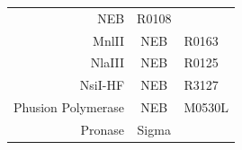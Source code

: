 \documentclass[11pt,singlespacinge,twoside]{reedthesis} %
\theoremstyle{definition}
\theoremstyle{definition}
\theoremstyle{definition}
\theoremstyle{remark}
\begin{document}
\begin{longtable}[]{@{}rcl@{}}
\begin{minipage}[t]{0.33\columnwidth}
NEB\strut
\end{minipage} & \begin{minipage}[t]{0.29\columnwidth}\raggedright
R0108\strut
\end{minipage}\tabularnewline
\begin{minipage}[t]{0.29\columnwidth}\raggedleft
MnlII\strut
\end{minipage} & \begin{minipage}[t]{0.33\columnwidth}\centering
NEB\strut
\end{minipage} & \begin{minipage}[t]{0.29\columnwidth}\raggedright
R0163\strut
\end{minipage}\tabularnewline
\begin{minipage}[t]{0.29\columnwidth}\raggedleft
NlaIII\strut
\end{minipage} & \begin{minipage}[t]{0.33\columnwidth}\centering
NEB\strut
\end{minipage} & \begin{minipage}[t]{0.29\columnwidth}\raggedright
R0125\strut
\end{minipage}\tabularnewline
\begin{minipage}[t]{0.29\columnwidth}\raggedleft
NsiI-HF\strut
\end{minipage} & \begin{minipage}[t]{0.33\columnwidth}\centering
NEB\strut
\end{minipage} & \begin{minipage}[t]{0.29\columnwidth}\raggedright
R3127\strut
\end{minipage}\tabularnewline
\begin{minipage}[t]{0.29\columnwidth}\raggedleft
Phusion Polymerase\strut
\end{minipage} & \begin{minipage}[t]{0.33\columnwidth}\centering
NEB\strut
\end{minipage} & \begin{minipage}[t]{0.29\columnwidth}\raggedright
M0530L\strut
\end{minipage}\tabularnewline
\begin{minipage}[t]{0.29\columnwidth}\raggedleft
Pronase\strut
\end{minipage} & \begin{minipage}[t]{0.33\columnwidth}\centering
Sigma\strut
\end{minipage} & \begin{minipage}[t]{0.29\columnwidth}\raggedright

\end{minipage}
\end{longtable}
\end{document}
